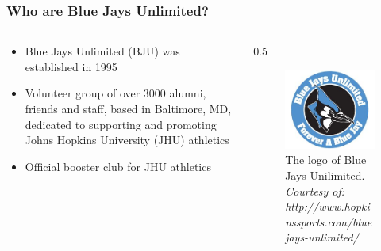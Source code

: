\documentclass[compress,handout,10pt]{beamer}
\let\olditem\item
\renewcommand{\item}{\setlength{\itemsep}{0.5\baselineskip}\olditem}
\begin{document}
\begin{frame}
    \frametitle{Who are Blue Jays Unlimited?}
    \begin {columns}
    	\begin{column}{0.5\textwidth}
    		\begin {itemize}
    			\item Blue Jays Unlimited (BJU) was established in 1995
    			\item Volunteer group of over 3000 alumni, friends and staff, based in Baltimore, MD, dedicated to supporting and promoting Johns Hopkins University (JHU) athletics
    			\item Official booster club for JHU athletics
    		\end {itemize}
    	\end {column}
    	\begin {column}{0.5\textwidth}
    	\begin{figure} [h]
    		\begin{center}
    			\includegraphics [width=2in] {BJU.jpg}
    			\caption {{\scriptsize The logo of Blue Jays Unilimited. \textit{Courtesy of: http://www.hopkinssports.com/bluejays-unlimited/}}}
    		\end{center}
    	\end {figure}	
    	\end {column}
    \end{columns}
\end{frame}
\end{document}
